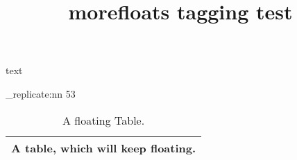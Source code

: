 \documentclass{article}
\title{morefloats tagging test}
\newcommand{\floattest}{%
  \begin{table}[t]\centering%
    \begin{tabular}{|l|}%
      \hline%
      A table, which will keep floating.\\%
      \hline
    \end{tabular}%
    \caption{A floating Table.}%
  \end{table}%
  }
\begin{document}
text

\ExplSyntaxOn
\prg_replicate:nn { 53 } { \floattest } %
\ExplSyntaxOff
\end{document}
